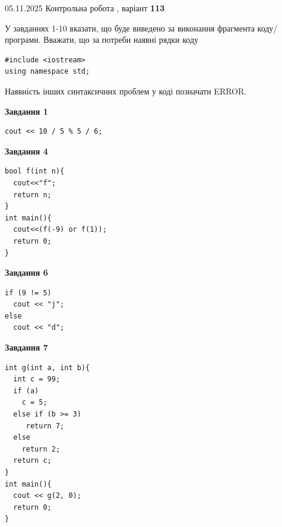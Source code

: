\documentclass[12pt, ukrainian]{article}
\begin{document}
{\Large{05.11.2025 Контрольна робота , варіант  \No \textbf { 113 }\par}}
{
\begin {large}
У завданнях 1-10 вказати, що буде виведено за виконання фрагмента коду/про\-гра\-ми.
Вважати, що за потреби наявні рядки коду
\begin{verbatim}
#include <iostream>
using namespace std;
\end{verbatim}
Наявність інших синтаксичних проблем у коді позначати ERROR.

\begin{minipage}[t]{7.0cm}

\begin{center}
\textbf{Завдання 1}
\end{center}
\vspace{-8mm}

\begin{verbatim}
cout << 10 / 5 % 5 / 6;
\end{verbatim}



\begin{center}
\textbf{Завдання 4}
\end{center}
\vspace{-8mm}

\begin{verbatim}
bool f(int n){
  cout<<"f";
  return n;
}
int main(){
  cout<<(f(-9) or f(1));
  return 0;
}
\end{verbatim}



\begin{center}
\textbf{Завдання 6}
\end{center}
\vspace{-8mm}

\begin{verbatim}
if (9 != 5)
  cout << "j";
else
  cout << "d";
\end{verbatim}



\begin{center}
\textbf{Завдання 7}
\end{center}
\vspace{-8mm}

\begin{verbatim}
int g(int a, int b){
  int c = 99;
  if (a)
    c = 5;
  else if (b >= 3)
     return 7;
  else
    return 2;
  return c;
}
int main(){
  cout << g(2, 0);
  return 0;
}
\end{verbatim}


\end{minipage}
\end{large}}
\end{document}
